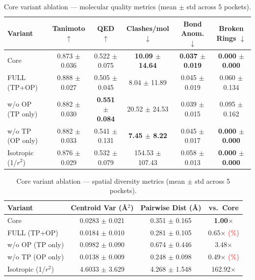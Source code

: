 \documentclass[a4paper,11pt]{article}
\begin{document}
\begin{table}[H]
\centering
\caption{Core variant ablation --- molecular quality metrics
         (mean $\pm$ std across 5 pockets).}
\label{tab:variant_ablation}
\small
\begin{tabular}{l c c c c c}
\toprule
\textbf{Variant} & \textbf{Tanimoto $\uparrow$} & \textbf{QED $\uparrow$} &
\textbf{Clashes/mol $\downarrow$} & \textbf{Bond Anom. $\downarrow$} & \textbf{Broken Rings $\downarrow$} \\
\midrule
Core                    & 0.873 $\pm$ 0.036 & 0.522 $\pm$ 0.075 & \textbf{10.09 $\pm$ 14.64}  & \textbf{0.037 $\pm$ 0.019} & \textbf{0.000 $\pm$ 0.000} \\
FULL (TP+OP)            & 0.888 $\pm$ 0.027 & 0.505 $\pm$ 0.045 & 8.04 $\pm$ 11.89           & 0.045 $\pm$ 0.019          & 0.060 $\pm$ 0.134 \\
w/o OP (TP only)        & 0.882 $\pm$ 0.030 & \textbf{0.551 $\pm$ 0.084} & 20.52 $\pm$ 24.53          & 0.039 $\pm$ 0.015          & 0.095 $\pm$ 0.162 \\
w/o TP (OP only)        & 0.882 $\pm$ 0.033 & 0.541 $\pm$ 0.131 & \textbf{7.45 $\pm$ 8.22}   & 0.045 $\pm$ 0.017          & \textbf{0.000 $\pm$ 0.000} \\
Isotropic (1/$r^2$)     & 0.876 $\pm$ 0.029 & 0.532 $\pm$ 0.079 & 154.53 $\pm$ 107.43        & 0.058 $\pm$ 0.013          & \textbf{0.000 $\pm$ 0.000} \\
\bottomrule
\end{tabular}
\end{table}

\begin{table}[H]
\centering
\caption{Core variant ablation --- spatial diversity metrics
         (mean $\pm$ std across 5 pockets).}
\label{tab:variant_spatial}
\begin{tabular}{l c c c}
\toprule
\textbf{Variant} & \textbf{Centroid Var (\AA$^2$)} & \textbf{Pairwise Dist (\AA)} & \textbf{vs.\ Core} \\
\midrule
Core                    & 0.0283 $\pm$ 0.021 & 0.351 $\pm$ 0.165 & \textbf{1.00$\times$} \\
FULL (TP+OP)            & 0.0184 $\pm$ 0.010 & 0.281 $\pm$ 0.105 & 0.65$\times$ \textcolor{red}{(\textminus 35\%)} \\
w/o OP (TP only)        & 0.0982 $\pm$ 0.090 & 0.674 $\pm$ 0.446 & 3.48$\times$ \\
w/o TP (OP only)        & 0.0138 $\pm$ 0.009 & 0.248 $\pm$ 0.098 & 0.49$\times$ \textcolor{red}{(\textminus 51\%)} \\
Isotropic (1/$r^2$)     & 4.6033 $\pm$ 3.629 & 4.268 $\pm$ 1.548 & 162.92$\times$ \\
\bottomrule
\end{tabular}
\end{table}
\end{document}
